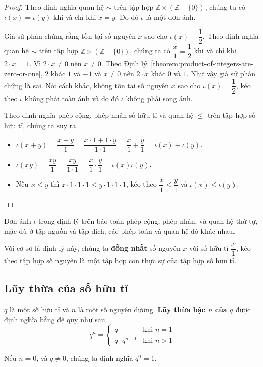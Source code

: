 \begin{proof}
    Theo định nghĩa quan hệ $\sim$ trên tập hợp $\mathbb{Z}\times (\mathbb{Z} - \{0\})$, chúng ta có $\iota(x) = \iota(y)$ khi và chỉ khi $x = y$. Do đó $\iota$ là một đơn ánh.

    Giả sử phản chứng rằng tồn tại số nguyên $x$ sao cho $\iota(x) = \dfrac{1}{2}$. Theo định nghĩa quan hệ $\sim$ trên tập hợp $\mathbb{Z}\times (\mathbb{Z} - \{0\})$, chúng ta có $\dfrac{x}{1} = \dfrac{1}{2}$ khi và chỉ khi $2\cdot x = 1$. Vì $2\cdot x\ne 0$ nên $x\ne 0$. Theo Định lý~\ref{theorem:product-of-integers-are-zero-or-one}, $2$ khác $1$ và $-1$ và $x\ne 0$ nên $2\cdot x$ khác $0$ và $1$. Như vậy giả sử phản chứng là sai. Nói cách khác, không tồn tại số nguyên $x$ sao cho $\iota(x) = \dfrac{1}{2}$, kéo theo $\iota$ không phải toàn ánh và do đó $\iota$ không phải song ánh.

    Theo định nghĩa phép cộng, phép nhân số hữu tỉ và quan hệ $\leq$ trên tập hợp số hữu tỉ, chúng ta suy ra
    \begin{itemize}
        \item $\iota(x + y) = \dfrac{x + y}{1} = \dfrac{x\cdot 1 + 1\cdot y}{1\cdot 1} = \dfrac{x}{1} + \dfrac{y}{1} = \iota(x) + \iota(y)$.
        \item $\iota(xy) = \dfrac{xy}{1} = \dfrac{xy}{1\cdot 1} = \dfrac{x}{1}\cdot\dfrac{y}{1} = \iota(x)\iota(y)$.
        \item Nếu $x\leq y$ thì $x\cdot 1\cdot 1\cdot 1\leq y\cdot 1\cdot 1\cdot 1$, kéo theo $\dfrac{x}{1}\leq \dfrac{y}{1}$ và $\iota(x)\leq \iota(y)$.
    \end{itemize}
\end{proof}

Đơn ánh $\iota$ trong định lý trên bảo toàn phép cộng, phép nhân, và quan hệ thứ tự, mặc dù ở tập nguồn và tập đích, các phép toán và quan hệ đó khác nhau.

Với cơ sở là định lý này, chúng ta \textbf{đồng nhất} số nguyên $x$ với số hữu tỉ $\dfrac{x}{1}$, kéo theo tập hợp số nguyên là một tập hợp con thực sự của tập hợp số hữu tỉ.

\subsection{Lũy thừa của số hữu tỉ}

\begin{definition}
    $q$ là một số hữu tỉ và $n$ là một số nguyên dương. \textbf{Lũy thừa bậc $n$ của $q$} được định nghĩa bằng đệ quy như sau
    \[
        q^{n} =
        \begin{cases}
            q              & \text{khi $n = 1$} \\
            q\cdot q^{n-1} & \text{khi $n > 1$}
        \end{cases}
    \]

    Nếu $n = 0$, và $q\ne 0$, chúng ta định nghĩa $q^{0} = 1$.
\end{definition}

